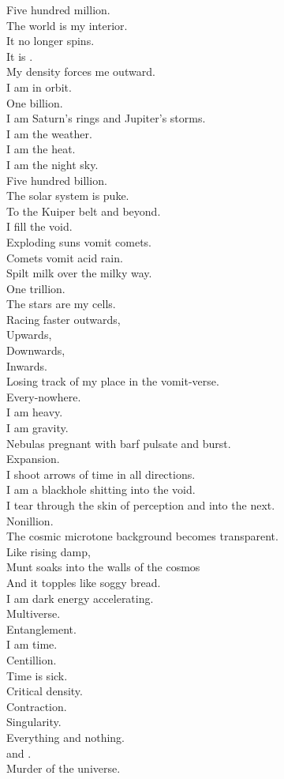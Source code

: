 Five hundred million. \\
The world is my interior. \\
It no longer spins. \\
It is . \\
My density forces me outward. \\
I am in orbit. \\

One billion. \\
I am Saturn's rings and Jupiter's storms. \\
I am the weather. \\
I am the  heat. \\
I am the night sky. \\

Five hundred billion. \\
The solar system is puke. \\
To the Kuiper belt and beyond. \\
I fill the void. \\
Exploding suns vomit comets. \\
Comets vomit acid rain. \\
Spilt milk over the milky way. \\

One trillion. \\
The stars are my cells. \\
Racing faster outwards, \\
Upwards, \\
Downwards, \\
Inwards. \\
Losing track of my place in the vomit-verse. \\
Every-nowhere. \\

I am heavy. \\
I am gravity. \\
Nebulas pregnant with barf pulsate and burst. \\
Expansion. \\
I shoot arrows of time in all directions. \\
I am a blackhole shitting into the void. \\
I tear through the skin of perception and into the next. \\

Nonillion. \\
The cosmic microtone background becomes transparent. \\
Like rising damp, \\
Munt soaks into the walls of the cosmos \\
And it topples like soggy bread. \\
I am dark energy accelerating. \\
Multiverse. \\

Entanglement. \\
I am time. \\
Centillion. \\
Time is sick. \\
Critical density. \\
Contraction. \\
Singularity. \\
Everything and nothing. \\
 and . \\
Murder of the universe. \\

